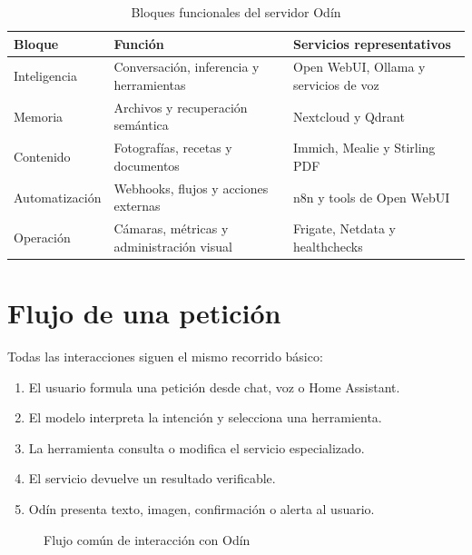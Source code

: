 \begin{table}[H]
  \centering
  \caption{Bloques funcionales del servidor Odín}
  \label{tab:arquitectura-capas}
  \begin{tabularx}{\textwidth}{lXX}
    \toprule
    Bloque & Función & Servicios representativos \\
    \midrule
    Inteligencia & Conversación, inferencia y herramientas & Open WebUI,
    Ollama y servicios de voz \\
    Memoria & Archivos y recuperación semántica & Nextcloud y Qdrant \\
    Contenido & Fotografías, recetas y documentos & Immich, Mealie y
    Stirling PDF \\
    Automatización & Webhooks, flujos y acciones externas & n8n y tools de
    Open WebUI \\
    Operación & Cámaras, métricas y administración visual & Frigate, Netdata
    y healthchecks \\
    \bottomrule
  \end{tabularx}
\end{table}

\section{Flujo de una petición}
Todas las interacciones siguen el mismo recorrido básico:

\begin{enumerate}
  \item El usuario formula una petición desde chat, voz o Home Assistant.
  \item El modelo interpreta la intención y selecciona una herramienta.
  \item La herramienta consulta o modifica el servicio especializado.
  \item El servicio devuelve un resultado verificable.
  \item Odín presenta texto, imagen, confirmación o alerta al usuario.
\end{enumerate}

\begin{figure}[H]
  \centering
  \caption{Flujo común de interacción con Odín}
  \label{fig:flujo-odin}
\end{figure}

